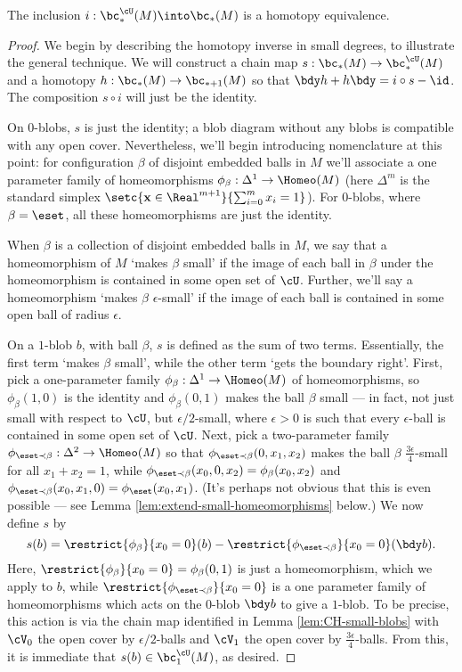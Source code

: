 \begin{thm}
The inclusion $i: \bc^{\cU}_*(M) \into \bc_*(M)$ is a homotopy equivalence.
\end{thm}
\begin{proof}
We begin by describing the homotopy inverse in small degrees, to illustrate the general technique.
We will construct a chain map $s:  \bc_*(M) \to \bc^{\cU}_*(M)$ and a homotopy $h:\bc_*(M) \to \bc_{*+1}(M)$ so that $\bdy h+h \bdy=i\circ s - \id$. The composition $s \circ i$ will just be the identity.

On $0$-blobs, $s$ is just the identity; a blob diagram without any blobs is compatible with any open cover. Nevertheless, we'll begin introducing nomenclature at this point: for configuration $\beta$ of disjoint embedded balls in $M$ we'll associate a one parameter family of homeomorphisms $\phi_\beta : \Delta^1 \to \Homeo(M)$ (here $\Delta^m$ is the standard simplex $\setc{\mathbf{x} \in \Real^{m+1}}{\sum_{i=0}^m x_i = 1}$). For $0$-blobs, where $\beta = \eset$, all these homeomorphisms are just the identity.

When $\beta$ is a collection of disjoint embedded balls in $M$, we say that a homeomorphism of $M$ `makes $\beta$ small' if the image of each ball in $\beta$ under the homeomorphism is contained in some open set of $\cU$. Further, we'll say a homeomorphism `makes $\beta$ $\epsilon$-small' if the image of each ball is contained in some open ball of radius $\epsilon$.

On a $1$-blob $b$, with ball $\beta$, $s$ is defined as the sum of two terms. Essentially, the first term `makes $\beta$ small', while the other term `gets the boundary right'. First, pick a one-parameter family $\phi_\beta : \Delta^1 \to \Homeo(M)$ of homeomorphisms, so $\phi_\beta(1,0)$ is the identity and $\phi_\beta(0,1)$ makes the ball $\beta$ small --- in fact, not just small with respect to $\cU$, but $\epsilon/2$-small, where $\epsilon > 0$ is such that every $\epsilon$-ball is contained in some open set of $\cU$. Next, pick a two-parameter family $\phi_{\eset \prec \beta} : \Delta^2 \to \Homeo(M)$ so that $\phi_{\eset \prec \beta}(0,x_1,x_2)$ makes the ball $\beta$ $\frac{3\epsilon}{4}$-small for all $x_1+x_2=1$, while $\phi_{\eset \prec \beta}(x_0,0,x_2) = \phi_\beta(x_0,x_2)$ and $\phi_{\eset \prec \beta}(x_0,x_1,0) = \phi_\eset(x_0,x_1)$. (It's perhaps not obvious that this is even possible --- see Lemma \ref{lem:extend-small-homeomorphisms} below.) We now define $s$ by
$$s(b) = \restrict{\phi_\beta}{x_0=0}(b) - \restrict{\phi_{\eset \prec \beta}}{x_0=0}(\bdy b).$$
Here, $\restrict{\phi_\beta}{x_0=0} = \phi_\beta(0,1)$ is just a homeomorphism, which we apply to $b$, while $\restrict{\phi_{\eset \prec \beta}}{x_0=0}$ is a one parameter family of homeomorphisms which acts on the $0$-blob $\bdy b$ to give a $1$-blob. To be precise, this action is via the chain map identified in Lemma \ref{lem:CH-small-blobs} with $\cV_0$ the open cover by $\epsilon/2$-balls and $\cV_1$ the open cover by $\frac{3\epsilon}{4}$-balls. From this, it is immediate that $s(b) \in \bc^{\cU}_1(M)$, as desired.


\end{proof}
